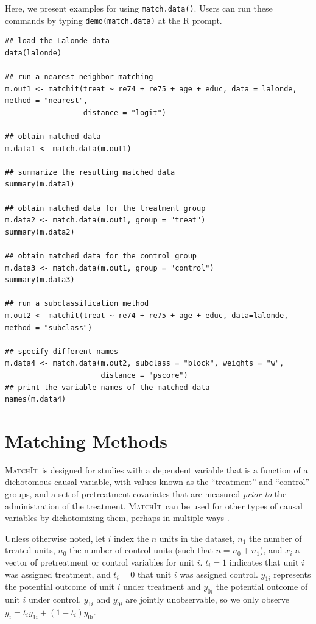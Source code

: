 \documentclass[oneside,letterpaper,titlepage]{article}
\newcommand{\MatchIt}{\textsc{MatchIt}}
\begin{document}
Here, we present examples for using {\tt match.data()}. Users can run
these commands by typing {\tt demo(match.data)} at the R prompt.
\begin{verbatim}
## load the Lalonde data
data(lalonde)

## run a nearest neighbor matching
m.out1 <- matchit(treat ~ re74 + re75 + age + educ, data = lalonde, method = "nearest",  
                  distance = "logit")

## obtain matched data 
m.data1 <- match.data(m.out1)

## summarize the resulting matched data
summary(m.data1)

## obtain matched data for the treatment group
m.data2 <- match.data(m.out1, group = "treat")
summary(m.data2)

## obtain matched data for the control group
m.data3 <- match.data(m.out1, group = "control")
summary(m.data3)

## run a subclassification method
m.out2 <- matchit(treat ~ re74 + re75 + age + educ, data=lalonde, method = "subclass")

## specify different names
m.data4 <- match.data(m.out2, subclass = "block", weights = "w",
                      distance = "pscore")
## print the variable names of the matched data
names(m.data4)
\end{verbatim}


\section{Matching Methods}
\label{methods}

\MatchIt\ is designed for studies with a dependent variable that is a
function of a dichotomous causal variable, with values known as the
``treatment'' and ``control'' groups, and a set of pretreatment
covariates that are measured {\it prior to} the administration of the
treatment.  \MatchIt\ can be used for other types of causal variables
by dichotomizing them, perhaps in multiple ways \citep[see
also][]{ImaDyk04}.

Unless otherwise noted, let $i$ index the $n$ units in the dataset,
$n_1$ the number of treated units, $n_0$ the number of control units
(such that $n=n_0+n_1$), and $x_i$ a vector of pretreatment or control
variables for unit $i$.  $t_i=1$ indicates that unit $i$ was assigned
treatment, and $t_i=0$ that unit $i$ was assigned control.  $y_{1i}$
represents the potential outcome of unit $i$ under treatment and
$y_{0i}$ the potential outcome of unit $i$ under control.  $y_{1i}$
and $y_{0i}$ are jointly unobservable, so we only observe
$y_i=t_iy_{1i}+(1-t_i)y_{0i}$.
\end{document}
